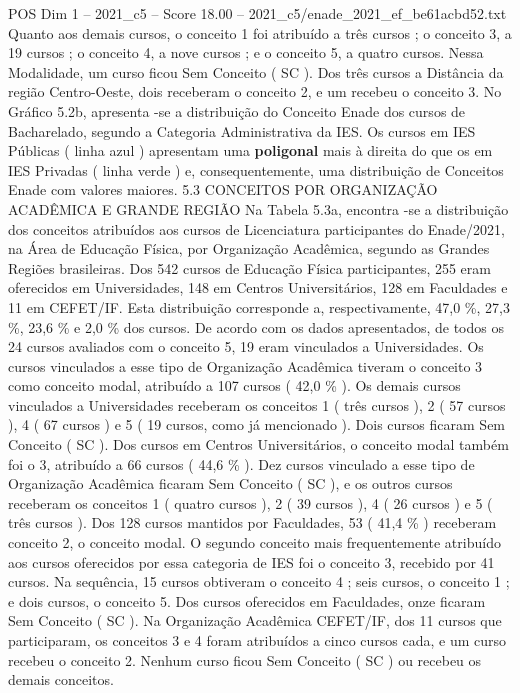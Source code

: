 \begin{textsample}{POS Dim 1 – 2021\_c5 – Score 18.00 – 2021\_c5/enade\_2021\_ef\_be61acbd52.txt}
Quanto aos demais cursos, o conceito 1 foi atribuído a três cursos ; o conceito 3, a 19 cursos ; o conceito 4, a nove cursos ; e o conceito 5, a quatro cursos.
Nessa Modalidade, um curso ficou Sem Conceito ( SC ).
Dos três cursos a Distância da região Centro-Oeste, dois receberam o conceito 2, e um recebeu o conceito 3.
No Gráfico 5.2b, apresenta -se a distribuição do Conceito Enade dos cursos de Bacharelado, segundo a Categoria Administrativa da IES.
Os cursos em IES Públicas ( linha azul ) apresentam uma \textbf{poligonal} mais à direita do que os em IES Privadas ( linha verde ) e, consequentemente, uma distribuição de Conceitos Enade com valores maiores. 5.3 CONCEITOS POR ORGANIZAÇÃO ACADÊMICA E GRANDE REGIÃO Na Tabela 5.3a, encontra -se a distribuição dos conceitos atribuídos aos cursos de Licenciatura participantes do Enade/2021, na Área de Educação Física, por Organização Acadêmica, segundo as Grandes Regiões brasileiras.
Dos 542 cursos de Educação Física participantes, 255 eram oferecidos em Universidades, 148 em Centros Universitários, 128 em Faculdades e 11 em CEFET/IF.
Esta distribuição corresponde a, respectivamente, 47,0 \%, 27,3 \%, 23,6 \% e 2,0 \% dos cursos.
De acordo com os dados apresentados, de todos os 24 cursos avaliados com o conceito 5, 19 eram vinculados a Universidades.
Os cursos vinculados a esse tipo de Organização Acadêmica tiveram o conceito 3 como conceito modal, atribuído a 107 cursos ( 42,0 \% ).
Os demais cursos vinculados a Universidades receberam os conceitos 1 ( três cursos ), 2 ( 57 cursos ), 4 ( 67 cursos ) e 5 ( 19 cursos, como já mencionado ).
Dois cursos ficaram Sem Conceito ( SC ).
Dos cursos em Centros Universitários, o conceito modal também foi o 3, atribuído a 66 cursos ( 44,6 \% ).
Dez cursos vinculado a esse tipo de Organização Acadêmica ficaram Sem Conceito ( SC ), e os outros cursos receberam os conceitos 1 ( quatro cursos ), 2 ( 39 cursos ), 4 ( 26 cursos ) e 5 ( três cursos ).
Dos 128 cursos mantidos por Faculdades, 53 ( 41,4 \% ) receberam conceito 2, o conceito modal.
O segundo conceito mais frequentemente atribuído aos cursos oferecidos por essa categoria de IES foi o conceito 3, recebido por 41 cursos.
Na sequência, 15 cursos obtiveram o conceito 4 ; seis cursos, o conceito 1 ; e dois cursos, o conceito 5.
Dos cursos oferecidos em Faculdades, onze ficaram Sem Conceito ( SC ).
Na Organização Acadêmica CEFET/IF, dos 11 cursos que participaram, os conceitos 3 e 4 foram atribuídos a cinco cursos cada, e um curso recebeu o conceito 2.
Nenhum curso ficou Sem Conceito ( SC ) ou recebeu os demais conceitos.

\end{textsample}
